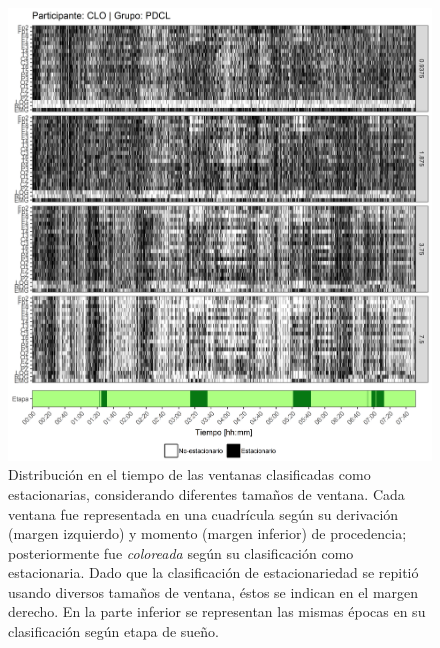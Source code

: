 \begin{figure}
\centering
\includegraphics[width=\linewidth]
{./scripts_graf_res/CLO_patrones_1.png}
\caption[Distribución en el tiempo de las ventanas clasificadas como estacionarias, considerando diferentes tamaños de ventana]{Distribución en el tiempo de las ventanas clasificadas como estacionarias, considerando diferentes tamaños de ventana. 
Cada ventana fue representada en una cuadrícula según su derivación (margen izquierdo) y momento (margen inferior) de procedencia; posteriormente fue \textit{coloreada} según su clasificación como estacionaria.
Dado que la clasificación de estacionariedad se repitió usando diversos tamaños de ventana, éstos se indican en el margen derecho.
En la parte inferior se representan las mismas épocas en su clasificación según etapa de sueño.}
\end{figure}
